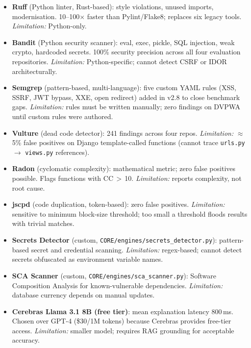 \documentclass[12pt,a4paper]{article}
\begin{document}
\begin{itemize}[leftmargin=1.5em]
  \item \textbf{Ruff} (Python linter, Rust-based): style violations, unused imports,
  modernisation.  10--100$\times$ faster than Pylint/Flake8; replaces six legacy tools.
  \emph{Limitation:} Python-only.

  \item \textbf{Bandit} (Python security scanner): eval, exec, pickle, SQL injection,
  weak crypto, hardcoded secrets.  100\% security precision across all four evaluation
  repositories.  \emph{Limitation:} Python-specific; cannot detect CSRF or IDOR
  architecturally.

  \item \textbf{Semgrep} (pattern-based, multi-language): five custom YAML rules
  (XSS, SSRF, JWT bypass, XXE, open redirect) added in v2.8 to close benchmark gaps.
  \emph{Limitation:} rules must be written manually; zero findings on DVPWA until
  custom rules were authored.

  \item \textbf{Vulture} (dead code detector): 241 findings across four repos.
  \emph{Limitation:} $\approx$5\% false positives on Django template-called functions
  (cannot trace \texttt{urls.py} $\to$ \texttt{views.py} references).

  \item \textbf{Radon} (cyclomatic complexity): mathematical metric; zero false
  positives possible.  Flags functions with CC\,$>$\,10.  \emph{Limitation:} reports
  complexity, not root cause.

  \item \textbf{jscpd} (code duplication, token-based): zero false positives.
  \emph{Limitation:} sensitive to minimum block-size threshold; too small a threshold
  floods results with trivial matches.

  \item \textbf{Secrets Detector} (custom, \texttt{CORE/engines/secrets\_detector.py}):
  pattern-based secret and credential scanning.  \emph{Limitation:} regex-based; cannot
  detect secrets obfuscated as environment variable names.

  \item \textbf{SCA Scanner} (custom, \texttt{CORE/engines/sca\_scanner.py}):
  Software Composition Analysis for known-vulnerable dependencies.
  \emph{Limitation:} database currency depends on manual updates.

  \item \textbf{Cerebras Llama 3.1 8B (free tier)}: mean explanation latency 800\,ms.
  Chosen over GPT-4 (\$30/1M tokens) because Cerebras provides free-tier access.
  \emph{Limitation:} smaller model; requires RAG grounding for acceptable accuracy.


\end{itemize}
\end{document}
